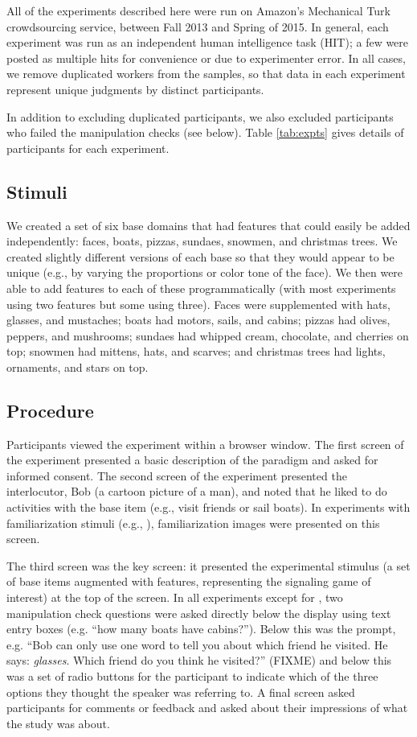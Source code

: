 All of the experiments described here were run on Amazon's Mechanical Turk crowdsourcing service, between Fall 2013 and Spring of 2015. In general, each experiment was run as an independent human intelligence task (HIT); a few were posted as multiple hits for convenience or due to experimenter error. In all cases, we remove duplicated workers from the samples, so that data in each experiment represent unique judgments by distinct participants. 

In addition to excluding duplicated participants, we also excluded participants who failed the manipulation checks (see below). Table \ref{tab:expts} gives details of participants for each experiment. 

\subsection{Stimuli}

We created a set of six base domains that had features that could easily be added independently: faces, boats, pizzas, sundaes, snowmen, and christmas trees. We created slightly different versions of each base so that they would appear to be unique (e.g., by varying the proportions or color tone of the face). We then were able to add features to each of these programmatically (with most experiments using two features but some using three). Faces were supplemented with hats, glasses, and mustaches; boats had motors, sails, and cabins; pizzas had olives, peppers, and mushrooms; sundaes had whipped cream, chocolate, and cherries on top; snowmen had mittens, hats, and scarves; and christmas trees had lights, ornaments, and stars on top.

\subsection{Procedure}

Participants viewed the experiment within a browser window. The first screen of the experiment presented a basic description of the paradigm and asked for informed consent. The second screen of the experiment presented the interlocutor, Bob (a cartoon picture of a man), and noted that he liked to do activities with the base item (e.g., visit friends or sail boats). In experiments with familiarization stimuli (e.g., ), familiarization images were presented on this screen. 

The third screen was the key screen: it presented the experimental stimulus (a set of base items augmented with features, representing the signaling game of interest) at the top of the screen. In all experiments except for , two manipulation check questions were asked directly below the display using text entry boxes (e.g. ``how many boats have cabins?''). Below this was the prompt, e.g. ``Bob can only use one word to tell you about which friend he visited. He says: {\it glasses}. Which friend do you think he visited?'' (FIXME) and below this was a set of radio buttons for the participant to indicate which of the three options they thought the speaker was referring to. A final screen asked participants for comments or feedback and asked about their impressions of what the study was about. 

